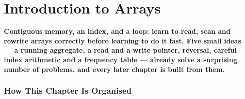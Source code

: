 %
\chapter{Introduction to Arrays}
\label{ch:introduction}

\begin{tcolorbox}[enhanced, colback=white, colframe=secondaryblue, boxrule=1pt, arc=2mm,
                  left=10pt, right=10pt]
\textbf{\large\textcolor{primaryblue}{Contiguous memory, an index, and a loop: learn to read, scan and rewrite arrays correctly before learning to do it fast. Five small ideas --- a running aggregate, a read and a write pointer, reversal, careful index arithmetic and a frequency table --- already solve a surprising number of problems, and every later chapter is built from them.}}
\end{tcolorbox}


\subsection*{How This Chapter Is Organised}

